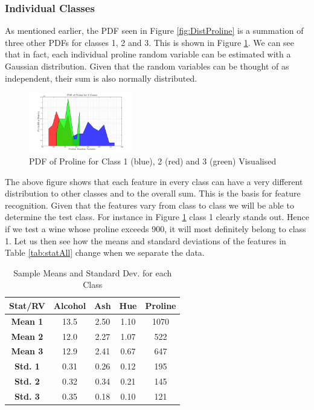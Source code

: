 \documentclass[10pt,twocolumn,letterpaper]{article}
\begin{document}
\subsubsection{Individual Classes} \label{sec:CovCla}

\indent \indent As mentioned earlier, the PDF seen in Figure \ref{fig:DistProline} is a summation of three other PDFs for classes 1, 2 and 3. This is shown in Figure \ref{fig:DistProline_Idv}. We can see that in fact, each individual proline random variable can be estimated with a Gaussian distribution. Given that the random variables can be thought of as independent, their sum is also normally distributed.

\begin{figure}[H]
\centering
\includegraphics[width=0.4\textwidth]{../results/Q1_ProlineDist_Idv}
\caption{PDF of Proline for Class 1 (blue), 2 (red) and 3 (green) Visualised \label{fig:DistProline_Idv}}
\end{figure}

The above figure shows that each feature in every class can have a very different distribution to other classes and to the overall sum. This is the basis for feature recognition. Given that the features vary from class to class we will be able to determine the test class. For instance in Figure \ref{fig:DistProline_Idv} class 1 clearly stands out. Hence if we test a wine whose proline exceeds 900, it will most definitely belong to class 1. Let us then see how the means and standard deviations of the features in Table \ref{tab:statAll} change when we separate the data.

\begin{table}
\caption{Sample Means and Standard Dev. for each Class \label{tab:statCla}}
\footnotesize
\begin{center}
\begin{tabular}{|c| c c c c|}
\hline
\bf Stat/RV & Alcohol & Ash & Hue & Proline \\ [0.5ex]
\hline
\bf Mean 1 & 13.5 & 2.50 & 1.10 & 1070 \\ [0.5ex]
\hline
\bf Mean 2 & 12.0 & 2.27 & 1.07 & 522 \\ [0.5ex]
\hline
\bf Mean 3 & 12.9 & 2.41 & 0.67 & 647 \\ [0.5ex]
\hline
\bf Std. 1 & 0.31 & 0.26 & 0.12 & 195 \\ [0.5ex]
\hline
\bf Std. 2 & 0.32 & 0.34 & 0.21 & 145 \\ [0.5ex]
\hline
\bf Std. 3 & 0.35 & 0.18 & 0.10 & 121 \\ [0.5ex]
\hline
\end{tabular}
\end{center}
\vspace{-5mm}
\end{table}
\end{document}
